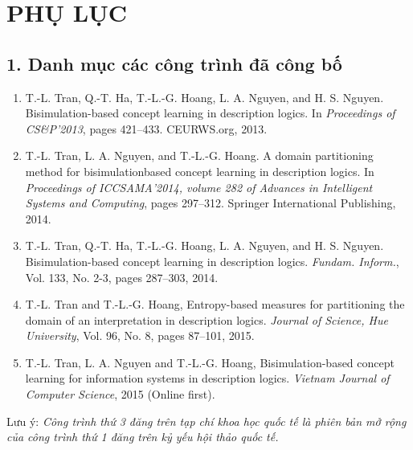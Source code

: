 \chapter*{PHỤ LỤC}
\label{chap.PhuLuc}
\thispagestyle{fancy}
\vspace{-2.0ex}
\section*{1. Danh mục các công trình đã công bố}
\begin{small}
	\begin{enumerate}
		\setlength{\itemsep}{-0.1ex}
		
		\item T.-L. Tran, Q.-T. Ha, T.-L.-G. Hoang, L. A. Nguyen, and H. S. Nguyen. Bisimulation-based concept learning in description logics. In {\em Proceedings of CS\&P'2013}, pages 421--433. CEURWS.org, 2013.
		
		\item T.-L. Tran, L. A. Nguyen, and T.-L.-G. Hoang. A domain partitioning method for bisimulationbased concept learning in description logics. In {\em Proceedings of ICCSAMA'2014, volume 282 of Advances in Intelligent Systems and Computing}, pages 297--312. Springer International Publishing, 2014.
		
		\item T.-L. Tran, Q.-T. Ha, T.-L.-G. Hoang, L. A. Nguyen, and H. S. Nguyen. Bisimulation-based concept learning in description logics. {\em Fundam. Inform.}, Vol. 133, No. 2-3, pages 287--303, 2014.
		
		\item T.-L. Tran and T.-L.-G. Hoang, Entropy-based measures for partitioning the domain of an interpretation in description logics. {\em Journal of Science, Hue University}, Vol. 96, No. 8, pages 87--101, 2015.

		\item T.-L. Tran, L. A. Nguyen and T.-L.-G. Hoang, Bisimulation-based concept learning for information systems in description logics. {\em Vietnam Journal of Computer Science}, 2015 (Online first).
	\end{enumerate}
	\vspace{-2.0ex}
	Lưu ý: {\em Công trình thứ 3 đăng trên tạp chí khoa học quốc tế là phiên bản mở rộng của công trình thứ 1 đăng trên kỷ yếu hội thảo quốc tế.}
\end{small}

